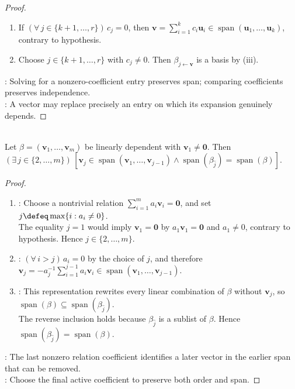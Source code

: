 \begin{lemma}
\begin{proof}
\begin{enumerate}[label=(\roman*)]
Therefore $\beta_{j\leftarrow\mathbf{v}}$ is linearly independent; it spans $\mathcal{V}$ by (ii), so it is a basis.
\item If $(\forall\,j\in\{k+1,\ldots,r\})\,c_j=0$, then $\mathbf{v}=\sum\limits_{i=1}^{k}c_i\mathbf{u}_i\in\operatorname{span}(\mathbf{u}_1,\ldots,\mathbf{u}_k)$, contrary to hypothesis.\\
\item Choose $j\in\{k+1,\ldots,r\}$ with $c_j\neq0$. Then $\beta_{j\leftarrow\mathbf{v}}$ is a basis by (iii).
\end{enumerate}
: Solving for a nonzero-coefficient entry preserves span; comparing coefficients preserves independence.\\
: A vector may replace precisely an entry on which its expansion genuinely depends.
\end{proof}
\end{lemma}


\begin{lemma} \label{lem:lineardependencelemma} \\
Let $\beta=(\mathbf{v}_1,\ldots,\mathbf{v}_m)$ be linearly dependent with $\mathbf{v}_1\neq\mathbf{0}$. Then $(\exists\,j\in\{2,\ldots,m\})\,[\mathbf{v}_j\in\operatorname{span}(\mathbf{v}_1,\ldots,\mathbf{v}_{j-1})\land\operatorname{span}(\beta_{\widehat{j}})=\operatorname{span}(\beta)]$.
\begin{proof}
\begin{enumerate}[label=(\roman*)]
\setlength{\itemsep}{0pt}
\item {}: Choose a nontrivial relation $\sum\limits_{i=1}^{m}a_i\mathbf{v}_i=\mathbf{0}$, and set $j\defeq\max\{i:a_i\neq0\}$.\\
The equality $j=1$ would imply $\mathbf{v}_1=\mathbf{0}$ by $a_1\mathbf{v}_1=\mathbf{0}$ and $a_1\neq0$, contrary to hypothesis. Hence $j\in\{2,\ldots,m\}$.
\item {}: $(\forall\,i>j)\,a_i=0$ by the choice of $j$, and therefore $\mathbf{v}_j=-a_j^{-1}\sum\limits_{i=1}^{j-1}a_i\mathbf{v}_i\in\operatorname{span}(\mathbf{v}_1,\ldots,\mathbf{v}_{j-1})$.
\item {}: This representation rewrites every linear combination of $\beta$ without $\mathbf{v}_j$, so $\operatorname{span}(\beta)\subseteq\operatorname{span}(\beta_{\widehat{j}})$.\\
The reverse inclusion holds because $\beta_{\widehat{j}}$ is a sublist of $\beta$. Hence $\operatorname{span}(\beta_{\widehat{j}})=\operatorname{span}(\beta)$.
\end{enumerate}
: The last nonzero relation coefficient identifies a later vector in the earlier span that can be removed.\\
: Choose the final active coefficient to preserve both order and span.
\end{proof}
\end{lemma}

